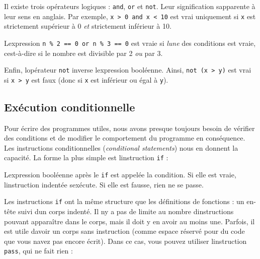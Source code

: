 Il existe trois opérateurs logiques : \texttt{and}, \texttt{or} et
\texttt{not}. Leur signification s\textquotesingle apparente à leur sens
en anglais. Par exemple,
\texttt{x\ \textgreater{}\ 0\ and\ x\ \textless{}\ 10} est vrai
uniquement si \texttt{x} est strictement supérieur à 0 \emph{et}
strictement inférieur à 10.

L\textquotesingle expression
\texttt{n\ \%\ 2\ ==\ 0\ or\ n\ \%\ 3\ ==\ 0} est vraie si
\emph{l\textquotesingle une} des conditions est vraie,
c\textquotesingle est-à-dire si le nombre est divisible par 2 \emph{ou}
par 3.

Enfin, l\textquotesingle opérateur \texttt{not} inverse
l\textquotesingle expression booléenne. Ainsi,
\texttt{not\ (x\ \textgreater{}\ y)} est vrai si
\texttt{x\ \textgreater{}\ y} est faux (donc si \texttt{x} est inférieur
ou égal à \texttt{y}).

\hypertarget{exuxe9cution-conditionnelle}{%
\subsection{Exécution
conditionnelle}\label{exuxe9cution-conditionnelle}}

Pour écrire des programmes utiles, nous avons presque toujours besoin de
vérifier des conditions et de modifier le comportement du programme en
conséquence. Les instructions conditionnelles (\emph{conditional
statements}) nous en donnent la capacité. La forme la plus simple est
l\textquotesingle instruction \texttt{if} :

\begin{Shaded}
\begin{Highlighting}[]
\OperatorTok{\textgreater{}} \NormalTok{:}
    \NormalTok{(}\NormalTok{)}
\end{Highlighting}
\end{Shaded}

L\textquotesingle expression booléenne après le \texttt{if} est appelée
la condition. Si elle est vraie, l\textquotesingle instruction indentée
s\textquotesingle exécute. Si elle est fausse, rien ne se passe.

Les instructions \texttt{if} ont la même structure que les définitions
de fonctions : un en-tête suivi d\textquotesingle un corps indenté. Il
n\textquotesingle y a pas de limite au nombre
d\textquotesingle instructions pouvant apparaître dans le corps, mais il
doit y en avoir au moins une. Parfois, il est utile
d\textquotesingle avoir un corps sans instruction (comme espace réservé
pour du code que vous n\textquotesingle avez pas encore écrit). Dans ce
cas, vous pouvez utiliser l\textquotesingle instruction \texttt{pass},
qui ne fait rien :


